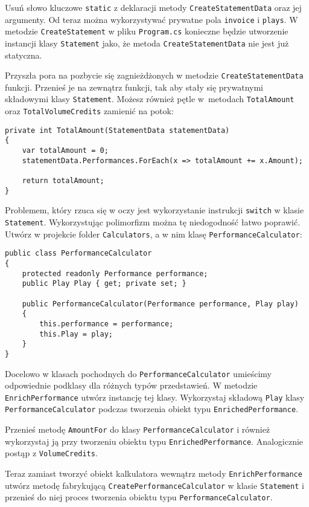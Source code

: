 Usuń słowo kluczowe \texttt{static} z deklaracji metody \texttt{CreateStatementData} oraz jej argumenty. Od teraz można wykorzystywać prywatne pola \texttt{invoice} i \texttt{plays}. W metodzie \texttt{CreateStatement} w pliku \texttt{Program.cs} konieczne będzie utworzenie instancji klasy \texttt{Statement} jako, że metoda \texttt{CreateStatementData} nie jest już statyczna.


Przyszła pora na pozbycie się zagnieżdżonych w metodzie \texttt{CreateStatementData} funkcji. Przenieś je na zewnątrz funkcji, tak aby stały się prywatnymi składowymi klasy \texttt{Statement}. Możesz również pętle w~metodach \texttt{TotalAmount} oraz \texttt{TotalVolumeCredits} zamienić na potok:
\begin{lstlisting}
private int TotalAmount(StatementData statementData)
{
	var totalAmount = 0;
	statementData.Performances.ForEach(x => totalAmount += x.Amount);
	
	return totalAmount;
}
\end{lstlisting}

Problemem, który rzuca się w oczy jest wykorzystanie instrukcji \texttt{switch} w klasie \texttt{Statement}. Wykorzystując polimorfizm można tę niedogodność łatwo poprawić. Utwórz w projekcie folder \texttt{Calculators}, a w nim klasę \texttt{PerformanceCalculator}:
\begin{lstlisting}
public class PerformanceCalculator
{
	protected readonly Performance performance;
	public Play Play { get; private set; }
	
	public PerformanceCalculator(Performance performance, Play play)
	{
		this.performance = performance;
		this.Play = play;
	}
}
\end{lstlisting}
Docelowo w klasach pochodnych do \texttt{PerformanceCalculator} umieścimy odpowiednie podklasy dla różnych typów przedstawień. W metodzie \texttt{EnrichPerformance} utwórz instancję tej klasy. Wykorzystaj składową \texttt{Play} klasy \texttt{PerformanceCalculator} podczas tworzenia obiekt typu \texttt{EnrichedPerformance}. 

Przenieś metodę \texttt{AmountFor} do klasy \texttt{PerformanceCalculator} i również wykorzystaj ją przy tworzeniu obiektu typu \texttt{EnrichedPerformance}. Analogicznie postąp z \texttt{VolumeCredits}. 

Teraz zamiast tworzyć obiekt kalkulatora wewnątrz metody \texttt{EnrichPerformance} utwórz metodę fabrykującą \texttt{CreatePerformanceCalculator} w klasie \texttt{Statement} i przenieś do niej proces tworzenia obiektu typu \texttt{PerformanceCalculator}.

